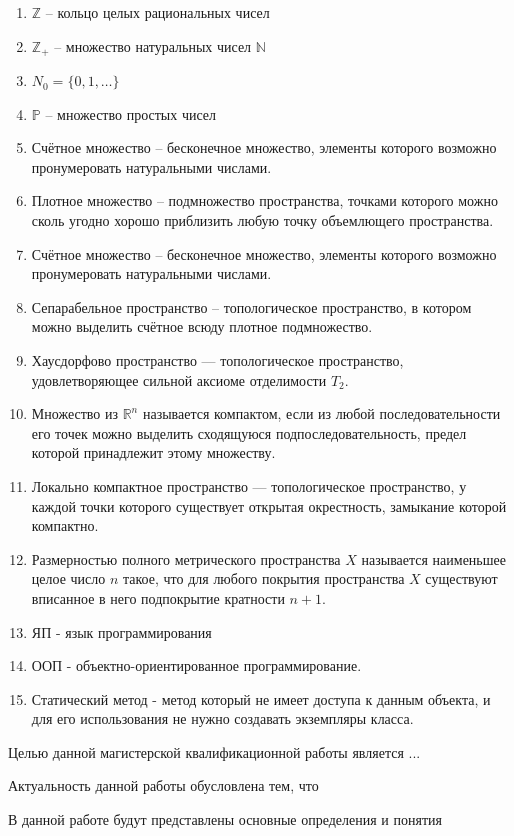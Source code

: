 \documentclass[master, och, diploma, times]{sty/SCWorks}
\theoremstyle{plain}
\theoremstyle{definition}
\begin{document}
\begin{enumerate}
	\item $\mathbb {Z}$ -- кольцо целых рациональных чисел
	\item $\mathbb {Z}_{+}$ -- множество натуральных чисел $\mathbb {N}$
	\item ${N}_0=\{0,1,\dots\}$
	\item $\mathbb {P}$ -- множество простых чисел
	\item Счётное множество -- бесконечное множество, элементы которого возможно пронумеровать натуральными числами.
	\item Плотное множество -- подмножество пространства, точками которого можно сколь угодно хорошо приблизить любую точку объемлющего пространства.
	\item Счётное множество -- бесконечное множество, элементы которого возможно пронумеровать натуральными числами.
	\item Сепарабельное пространство -- топологическое пространство, в котором можно выделить счётное всюду плотное подмножество.
	\item Хаусдорфово пространство — топологическое пространство, удовлетворяющее сильной аксиоме отделимости $T_2$.
	\item Множество из $\mathbb {R}^n$ называется компактом, если из любой последовательности его точек можно выделить сходящуюся подпоследовательность, предел которой принадлежит этому множеству.
	\item Локально компактное пространство — топологическое пространство, у каждой точки которого существует открытая окрестность, замыкание которой компактно.
	\item Размерностью полного метрического пространства $X$ называется наименьшее целое число $n$ такое, что для любого покрытия пространства $X$ существуют вписанное в него подпокрытие кратности $n+1$.
	\item ЯП - язык программирования
	\item ООП - объектно-ориентированное программирование.
	\item Статический метод - метод который не имеет доступа к данным объекта, и для его использования не нужно создавать экземпляры класса.
\end{enumerate}

\intro
Целью данной магистерской квалификационной работы является ...

Актуальность данной работы обусловлена тем, что

В данной работе будут представлены основные определения и понятия
\end{document}
